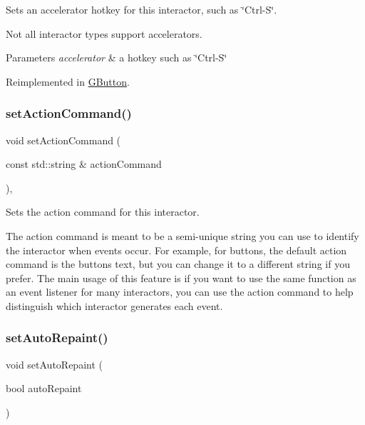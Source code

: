 Sets an accelerator hotkey for this interactor, such as \char`\"{}\+Ctrl-\/\+S\char`\"{}. 

Not all interactor types support accelerators. 
\begin{DoxyParams}{Parameters}
{\em accelerator} & a hotkey such as \char`\"{}\+Ctrl-\/\+S\char`\"{} \\
\hline
\end{DoxyParams}


Reimplemented in \mbox{\hyperlink{classGButton_a5f78fc506a33b57dced42a419be34446}{G\+Button}}.

\mbox{\label{classGInteractor_a4b5843fe3030e038a1ba54cc03389bcf}} 
\subsubsection{\texorpdfstring{set\+Action\+Command()}{setActionCommand()}}
{\footnotesize\ttfamily void set\+Action\+Command (\begin{DoxyParamCaption}\item[{const std\+::string \&}]{action\+Command }\end{DoxyParamCaption})\hspace{0.3cm}{\ttfamily [virtual]}, {\ttfamily [inherited]}}



Sets the action command for this interactor. 

The action command is meant to be a semi-\/unique string you can use to identify the interactor when events occur. For example, for buttons, the default action command is the button\textquotesingle{}s text, but you can change it to a different string if you prefer. The main usage of this feature is if you want to use the same function as an event listener for many interactors, you can use the action command to help distinguish which interactor generates each event. \mbox{\label{classGCanvas_ade731c276cd0bcd37639280d06571333}} 
\subsubsection{\texorpdfstring{set\+Auto\+Repaint()}{setAutoRepaint()}}
{\footnotesize\ttfamily void set\+Auto\+Repaint (\begin{DoxyParamCaption}\item[{bool}]{auto\+Repaint }\end{DoxyParamCaption})\hspace{0.3cm}{\ttfamily [virtual]}}



